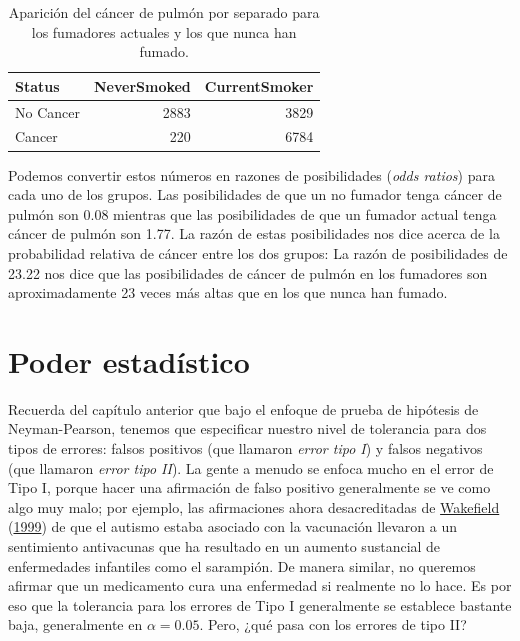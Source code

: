 \documentclass[
  12pt,
]{book}
\begin{document}
\begin{table}

\caption{\label{tab:unnamed-chunk-49}Aparición del cáncer de pulmón por separado para los fumadores actuales y los que nunca han fumado.}
\centering
\begin{tabular}[t]{l|r|r}
\hline
Status & NeverSmoked & CurrentSmoker\\
\hline
No Cancer & 2883 & 3829\\
\hline
Cancer & 220 & 6784\\
\hline
\end{tabular}
\end{table}

Podemos convertir estos números en razones de posibilidades (\emph{odds ratios}) para cada uno de los grupos. Las posibilidades de que un no fumador tenga cáncer de pulmón son 0.08 mientras que las posibilidades de que un fumador actual tenga cáncer de pulmón son 1.77. La razón de estas posibilidades nos dice acerca de la probabilidad relativa de cáncer entre los dos grupos: La razón de posibilidades de 23.22 nos dice que las posibilidades de cáncer de pulmón en los fumadores son aproximadamente 23 veces más altas que en los que nunca han fumado.

\hypertarget{statistical-power}{%
\section{Poder estadístico}\label{statistical-power}}

Recuerda del capítulo anterior que bajo el enfoque de prueba de hipótesis de Neyman-Pearson, tenemos que especificar nuestro nivel de tolerancia para dos tipos de errores: falsos positivos (que llamaron \emph{error tipo I}) y falsos negativos (que llamaron \emph{error tipo II}). La gente a menudo se enfoca mucho en el error de Tipo I, porque hacer una afirmación de falso positivo generalmente se ve como algo muy malo; por ejemplo, las afirmaciones ahora desacreditadas de \protect\hyperlink{ref-wake:1999}{Wakefield} (\protect\hyperlink{ref-wake:1999}{1999}) de que el autismo estaba asociado con la vacunación llevaron a un sentimiento antivacunas que ha resultado en un aumento sustancial de enfermedades infantiles como el sarampión. De manera similar, no queremos afirmar que un medicamento cura una enfermedad si realmente no lo hace. Es por eso que la tolerancia para los errores de Tipo I generalmente se establece bastante baja, generalmente en \(\alpha = 0.05\). Pero, ¿qué pasa con los errores de tipo II?
\end{document}
